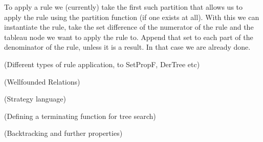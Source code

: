 \documentclass{report}
\theoremstyle{definition}
\begin{document}
To apply a rule we (currently) take the first such partition that allows us to
apply the rule using the partition function (if one exists at all). With this
we can instantiate the rule, take the set difference of the numerator of the
rule and the tableau node we want to apply the rule to. Append that set to each
part of the denominator of the rule, unless it is a result. In that case we are
already done.

(Different types of rule application, to SetPropF, DerTree etc)

(Wellfounded Relations)

(Strategy language)

(Defining a terminating function for tree search)

(Backtracking and further properties)
\end{document}
